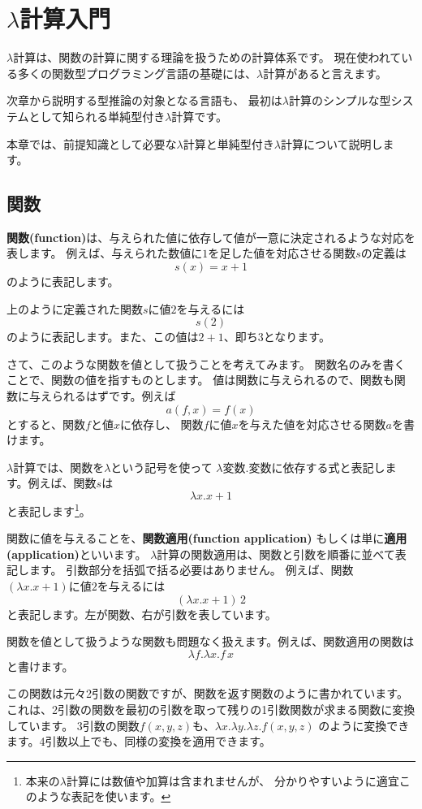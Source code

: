 
\chapter{$\lambda$計算入門}

$\lambda$計算は、関数の計算に関する理論を扱うための計算体系です。
現在使われている多くの関数型プログラミング言語の基礎には、$\lambda$計算があると言えます。

次章から説明する型推論の対象となる言語も、
最初は$\lambda$計算のシンプルな型システムとして知られる単純型付き$\lambda$計算です。

本章では、前提知識として必要な$\lambda$計算と単純型付き$\lambda$計算について説明します。

\section{関数}

\textbf{関数(function)}は、与えられた値に依存して値が一意に決定されるような対応を表します。
例えば、与えられた数値に$1$を足した値を対応させる関数$s$の定義は
\[
  s(x) = x+1
\]
のように表記します。

上のように定義された関数$s$に値$2$を与えるには
\[
  s(2)
\]
のように表記します。また、この値は$2+1$、即ち$3$となります。

さて、このような関数を値として扱うことを考えてみます。
関数名のみを書くことで、関数の値を指すものとします。
値は関数に与えられるので、関数も関数に与えられるはずです。例えば
\[
  a(f, x) = f(x)
\]
とすると、関数$f$と値$x$に依存し、
関数$f$に値$x$を与えた値を対応させる関数$a$を書けます。

$\lambda$計算では、関数を$\lambda$という記号を使って
$\lambda \text{変数} . \text{変数に依存する式}$と表記します。例えば、関数$s$は
\[
  \lambda x . x + 1
\]
と表記します\footnote{本来の$\lambda$計算には数値や加算は含まれませんが、
分かりやすいように適宜このような表記を使います。}。

関数に値を与えることを、\textbf{関数適用(function application)}
もしくは単に\textbf{適用(application)}といいます。
$\lambda$計算の関数適用は、関数と引数を順番に並べて表記します。
引数部分を括弧で括る必要はありません。
例えば、関数$(\lambda x . x + 1)$に値$2$を与えるには
\[
  (\lambda x . x + 1) \, 2
\]
と表記します。左が関数、右が引数を表しています。

関数を値として扱うような関数も問題なく扱えます。例えば、関数適用の関数は
\[
  \lambda f . \lambda x . f \, x
\]
と書けます。

この関数は元々2引数の関数ですが、関数を返す関数のように書かれています。
これは、2引数の関数を最初の引数を取って残りの1引数関数が求まる関数に変換しています。
3引数の関数$f(x, y, z)$も、$\lambda x . \lambda y . \lambda z . f(x, y, z)$
のように変換できます。4引数以上でも、同様の変換を適用できます。

